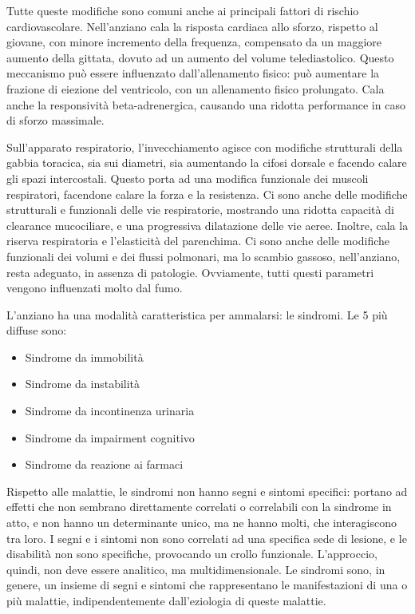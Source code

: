 Tutte queste modifiche sono comuni anche ai principali fattori di rischio 
cardiovascolare. Nell'anziano cala la risposta cardiaca allo sforzo, rispetto 
al giovane, con minore incremento della frequenza, compensato da un maggiore 
aumento della gittata, dovuto ad un aumento del volume telediastolico. Questo 
meccanismo può essere influenzato dall'allenamento fisico: può aumentare la 
frazione di eiezione del ventricolo, con un allenamento fisico prolungato. Cala 
anche la responsività beta-adrenergica, causando una ridotta performance in 
caso di sforzo massimale.

Sull'apparato respiratorio, l'invecchiamento agisce con modifiche strutturali 
della gabbia toracica, sia sui diametri, sia aumentando la cifosi dorsale e 
facendo calare gli spazi intercostali. Questo porta ad una modifica funzionale 
dei muscoli respiratori, facendone calare la forza e la resistenza.
Ci sono anche delle modifiche strutturali e funzionali delle vie respiratorie, 
mostrando una ridotta capacità di clearance mucociliare, e una progressiva 
dilatazione delle vie aeree. Inoltre, cala la riserva respiratoria e 
l'elasticità del parenchima. Ci sono anche delle modifiche funzionali dei 
volumi e dei flussi polmonari, ma lo scambio gassoso, nell'anziano, resta 
adeguato, in assenza di patologie. Ovviamente, tutti questi parametri vengono 
influenzati molto dal fumo.

L'anziano ha una modalità caratteristica per ammalarsi: le sindromi. Le 5 più 
diffuse sono:
\begin{itemize}
 \item Sindrome da immobilità
 \item Sindrome da instabilità
 \item Sindrome da incontinenza urinaria
 \item Sindrome da impairment cognitivo
 \item Sindrome da reazione ai farmaci
\end{itemize}

Rispetto alle malattie, le sindromi non hanno segni e sintomi specifici: 
portano ad effetti che non sembrano direttamente correlati o correlabili con la 
sindrome in atto, e non hanno un determinante unico, ma ne hanno molti, che 
interagiscono tra loro. I segni e i sintomi non sono correlati ad una specifica 
sede di lesione, e le disabilità non sono specifiche, provocando un crollo 
funzionale. L'approccio, quindi, non deve essere analitico, ma 
multidimensionale. Le sindromi sono, in genere, un insieme di segni e sintomi 
che rappresentano le manifestazioni di una o più malattie, indipendentemente 
dall'eziologia di queste malattie.


